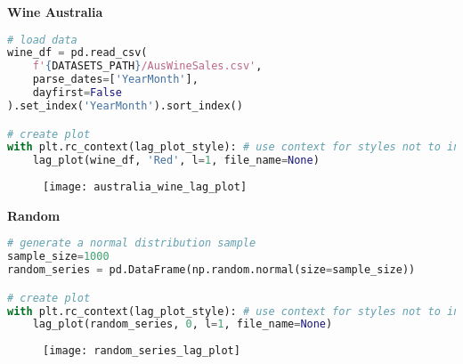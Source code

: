 
{\noindent\hspace{-12.5pt}\normalsize\bfseries Wine Australia}\vspace{-10pt}
\begin{center}
  \begin{lstlisting}[language=Python, 
  caption={График задержек продаж вина в Австралии.}, 
  label={lst:time_series_lag_plot_wine}]
# load data
wine_df = pd.read_csv(
    f'{DATASETS_PATH}/AusWineSales.csv',
    parse_dates=['YearMonth'],
    dayfirst=False
).set_index('YearMonth').sort_index()

# create plot
with plt.rc_context(lag_plot_style): # use context for styles not to interfere
    lag_plot(wine_df, 'Red', l=1, file_name=None)
  \end{lstlisting}
\end{center}

\begin{figure}[h!]
  \centering
  \texttt{[image: australia\_wine\_lag\_plot]}
\end{figure}\newpage


{\noindent\hspace{-12.5pt}\normalsize\bfseries Random}\vspace{-10pt}
\begin{center}
  \begin{lstlisting}[language=Python, 
  caption={График задержек белого шума.}, 
  label={lst:time_series_lag_plot_random}]
# generate a normal distribution sample
sample_size=1000
random_series = pd.DataFrame(np.random.normal(size=sample_size)) 

# create plot
with plt.rc_context(lag_plot_style): # use context for styles not to interfere
    lag_plot(random_series, 0, l=1, file_name=None)
  \end{lstlisting}
\end{center}

\begin{figure}[h!]
  \centering
  \texttt{[image: random\_series\_lag\_plot]}
\end{figure}\newpage


